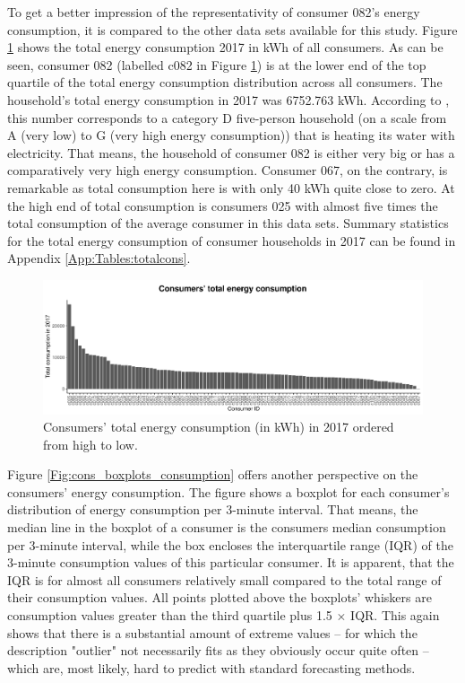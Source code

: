 To get a better impression of the representativity of consumer 082's energy consumption, it is compared to the other data sets available for this study. Figure \ref{Fig:cons_total_consumption} shows the total energy consumption 2017 in kWh of all consumers. As can be seen, consumer 082 (labelled c082 in Figure \ref{Fig:cons_total_consumption}) is at the lower end of the top quartile of the total energy consumption distribution across all consumers. The household's total energy consumption in 2017 was 6752.763 kWh. According to \citet{Stromspiegel:2017}, this number corresponds to a category D five-person household (on a scale from A (very low) to G (very high energy consumption)) that is heating its water with electricity. That means, the household of consumer 082 is either very big or has a comparatively very high energy consumption. Consumer 067, on the contrary, is remarkable as total consumption here is with only 40 kWh quite close to zero. At the high end of total consumption is consumers 025 with almost five times the total consumption of the average consumer in this data sets. Summary statistics for the total energy consumption of consumer households in 2017 can be found in Appendix \ref{App:Tables:totalcons}.

\begin{figure}[htbp]
 \centering
\includegraphics[width=\textwidth]{thesis/graphs/consumer_totalconsumption2.pdf}
\caption[Consumers' total energy consumption (in kWh) in 2017]{Consumers' total energy consumption (in kWh) in 2017 ordered from high to low. \quantnet}
\label{Fig:cons_total_consumption}
\end{figure}

Figure \ref{Fig:cons_boxplots_consumption} offers another perspective on the consumers' energy consumption. The figure shows a boxplot for each consumer's distribution of energy consumption per 3-minute interval. That means, the median line in the boxplot of a consumer is the consumers median consumption per 3-minute interval, while the box encloses the interquartile range (IQR) of the 3-minute consumption values of this particular consumer. It is apparent, that the IQR is for almost all consumers relatively small compared to the total range of their consumption values. All points plotted above the boxplots' whiskers are consumption values greater than the third quartile plus 1.5 $\times$ IQR. This again shows that there is a substantial amount of extreme values -- for which the description "outlier" not necessarily fits as they obviously occur quite often -- which are, most likely, hard to predict with standard forecasting methods.

